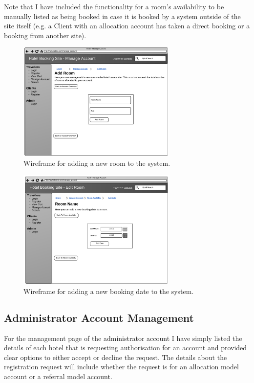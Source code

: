 \documentclass{article}
\begin{document}
Note that I have included the functionality for a room's availability to be manually listed as being booked in case it is booked by a system outside of the site itself (e.g. a Client with an allocation account has taken a direct booking or a booking from another site).

\begin{figure}[H]
\centering
\includegraphics[width=0.7\textwidth]{img/wireframes/AddRoom.png}
\caption{Wireframe for adding a new room to the system.}
\label{fig:wireframe-client-add-room}
\end{figure}

\begin{figure}[H]
\centering
\includegraphics[width=0.7\textwidth]{img/wireframes/AddDate.png}
\caption{Wireframe for adding a new booking date to the system.}
\label{fig:wireframe-client-add-date}
\end{figure}

\subsection{Administrator Account Management}
For the management page of the administrator account I have simply listed the details of each hotel that is requesting authorisation for an account and provided clear options to either accept or decline the request. The details about the registration request will include whether the request is for an allocation model account or a referral model account.
\end{document}
